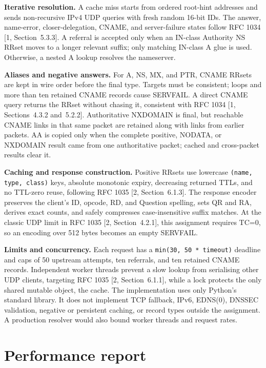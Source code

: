 \documentclass[11pt,a4paper]{article}
\newcommand{\code}[1]{\texttt{#1}}
\begin{document}
\textbf{Iterative resolution.} A cache miss starts from ordered root-hint
addresses and sends non-recursive IPv4 UDP queries with fresh random 16-bit IDs.
The answer, name-error, closer-delegation, CNAME, and server-failure states follow
RFC 1034 [1, Section~5.3.3]. A referral is accepted only when an IN-class
Authority NS RRset moves to a longer relevant suffix; only matching IN-class A
glue is used. Otherwise, a nested A lookup resolves the nameserver.

\textbf{Aliases and negative answers.} For A, NS, MX, and PTR, CNAME RRsets are
kept in wire order before the final type. Targets must be consistent; loops and
more than ten retained CNAME records cause SERVFAIL. A direct CNAME query returns
the RRset without chasing it, consistent with RFC 1034 [1, Sections~4.3.2
and~5.2.2]. Authoritative NXDOMAIN is final, but reachable CNAME links in that
same packet are retained along with links from earlier packets. AA is copied only
when the complete positive, NODATA, or NXDOMAIN result came from one authoritative
packet; cached and cross-packet results clear it.

\textbf{Caching and response construction.} Positive RRsets use lowercase
\code{(name, type, class)} keys, absolute monotonic expiry, decreasing returned
TTLs, and no TTL-zero reuse, following RFC 1035 [2, Section~6.1.3]. The response
encoder preserves the client's ID, opcode, RD, and Question spelling, sets QR and
RA, derives exact counts, and safely compresses case-insensitive suffix matches.
At the classic UDP limit in RFC 1035 [2, Section~4.2.1], this assignment requires
TC=0, so an encoding over 512 bytes becomes an empty SERVFAIL.

\textbf{Limits and concurrency.} Each request has a
\code{min(30, 50 * timeout)} deadline and caps of 50 upstream attempts, ten
referrals, and ten retained CNAME records. Independent worker threads prevent a
slow lookup from serialising other UDP clients, targeting RFC 1035 [2,
Section~6.1.1], while a lock protects the only shared mutable object, the cache.
The implementation uses only Python's standard library. It does not implement
TCP fallback, IPv6, EDNS(0), DNSSEC validation, negative or persistent caching,
or record types outside the assignment. A production resolver would also bound
worker threads and request rates.

\section{Performance report}
\end{document}
